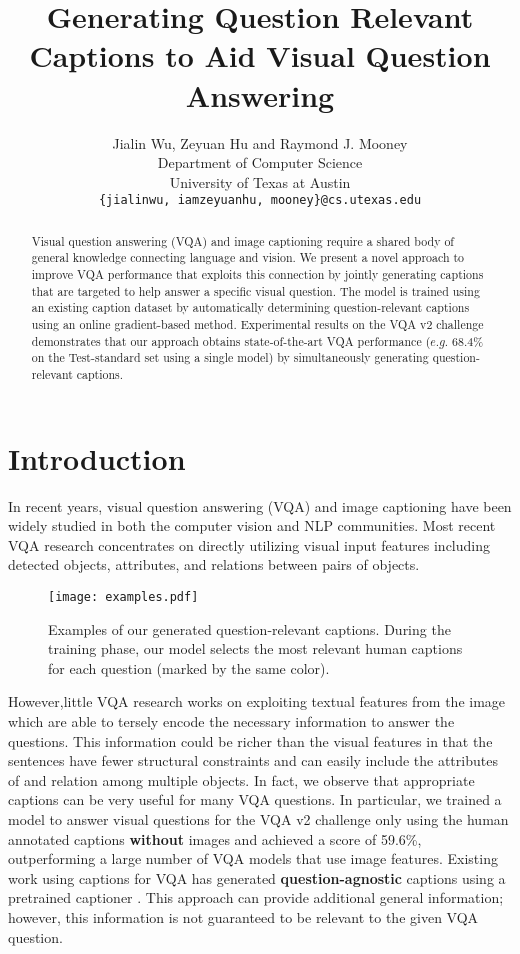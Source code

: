 \documentclass[11pt,a4paper]{article}
\title{Generating Question Relevant Captions to Aid Visual Question Answering}
\author{Jialin Wu, Zeyuan Hu and Raymond J. Mooney \\
  Department of Computer Science \\
  University of Texas at Austin \\
  \texttt{\{jialinwu, iamzeyuanhu, mooney\}@cs.utexas.edu}}
\date{}
\begin{document}
\maketitle
\begin{abstract}
Visual question answering (VQA) and image captioning require a shared body of general knowledge connecting language and vision. We present a novel approach to improve VQA performance that exploits this connection by jointly generating captions that are targeted to help answer a specific visual question. The model is trained using an existing caption dataset by automatically determining question-relevant captions using an online gradient-based method. Experimental results on the VQA v2 challenge demonstrates that our approach obtains state-of-the-art VQA performance ($e.g. $ 68.4\% on the Test-standard set using a single model) by simultaneously generating question-relevant captions.
\end{abstract}

\section{Introduction}
In recent years, visual question answering (VQA) \cite{antol2015vqa} and image captioning \cite{donahue2015long,rennie2017self} have been widely studied in both the computer vision and NLP communities. Most recent VQA research \cite{lu2017knowing,pedersoli2017areas,anderson2017bottom,lu2018r} concentrates on directly utilizing visual input features including detected objects, attributes, and relations between pairs of objects. 

\begin{figure}[!t]
\centering
\texttt{[image: examples.pdf]}
\caption{Examples of our generated question-relevant captions. During the training phase, our model selects the most relevant human captions for each question (marked by the same color).}
\label{fig:relevance_caption_example}
\end{figure}

However,little VQA research works on exploiting textual features from the image which are able to tersely encode the necessary information to answer the questions. This information could be richer than the visual features in that the sentences have fewer structural constraints and can easily include the attributes of and relation among multiple objects. In fact, we observe that appropriate captions can be very useful for many VQA questions. In particular, we trained a model to answer visual questions for the VQA v2 challenge \cite{antol2015vqa} only using the human annotated captions \textbf{without} images and achieved a score of 59.6\%, outperforming a large number of VQA models that use image features. Existing work using captions for VQA has generated \textbf{question-agnostic} captions using a pretrained captioner \cite{li2018tell}. This approach can provide additional general information; however, this information is not guaranteed to be relevant to the given VQA question. 
\end{document}
